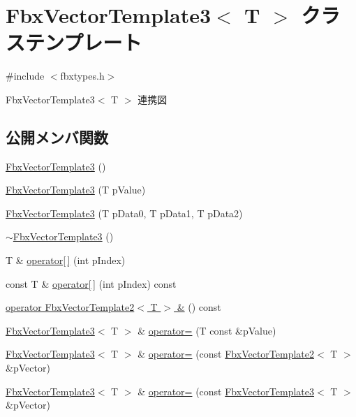 \hypertarget{class_fbx_vector_template3}{}\section{Fbx\+Vector\+Template3$<$ T $>$ クラステンプレート}
\label{class_fbx_vector_template3}


{\ttfamily \#include $<$fbxtypes.\+h$>$}



Fbx\+Vector\+Template3$<$ T $>$ 連携図
\subsection*{公開メンバ関数}
\begin{DoxyCompactItemize}
\item 
\hyperlink{class_fbx_vector_template3_a3a0d3989e58b800da934f7810410ea9a}{Fbx\+Vector\+Template3} ()
\item 
\hyperlink{class_fbx_vector_template3_ad7d4fc47cec6104ad5e2dabc9d585588}{Fbx\+Vector\+Template3} (T p\+Value)
\item 
\hyperlink{class_fbx_vector_template3_a2d817cb1291287fb6da72e625f37b22f}{Fbx\+Vector\+Template3} (T p\+Data0, T p\+Data1, T p\+Data2)
\item 
\hyperlink{class_fbx_vector_template3_ad63aac28d1db0cc96220e0d5508b1910}{$\sim$\+Fbx\+Vector\+Template3} ()
\item 
T \& \hyperlink{class_fbx_vector_template3_a8bf2926bdd00fd0322f826a572eb516d}{operator\mbox{[}$\,$\mbox{]}} (int p\+Index)
\item 
const T \& \hyperlink{class_fbx_vector_template3_a54b2f30b8fd0d4b32bf6df936682d5f0}{operator\mbox{[}$\,$\mbox{]}} (int p\+Index) const
\item 
\hyperlink{class_fbx_vector_template3_ae3592b0f562df1272dc844f451cb0111}{operator Fbx\+Vector\+Template2$<$ T $>$ \&} () const
\item 
\hyperlink{class_fbx_vector_template3}{Fbx\+Vector\+Template3}$<$ T $>$ \& \hyperlink{class_fbx_vector_template3_aed9997cebee8c4bfeef05b433de743ec}{operator=} (T const \&p\+Value)
\item 
\hyperlink{class_fbx_vector_template3}{Fbx\+Vector\+Template3}$<$ T $>$ \& \hyperlink{class_fbx_vector_template3_a6776a6fce109a4e5eac1ef4efb56f070}{operator=} (const \hyperlink{class_fbx_vector_template2}{Fbx\+Vector\+Template2}$<$ T $>$ \&p\+Vector)
\item 
\hyperlink{class_fbx_vector_template3}{Fbx\+Vector\+Template3}$<$ T $>$ \& \hyperlink{class_fbx_vector_template3_a19181aa6e706a12de98b417624e67e4d}{operator=} (const \hyperlink{class_fbx_vector_template3}{Fbx\+Vector\+Template3}$<$ T $>$ \&p\+Vector)

\end{DoxyCompactItemize}
